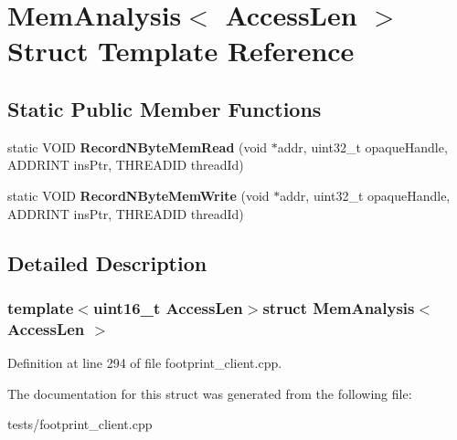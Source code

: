 \hypertarget{structMemAnalysis}{\section{Mem\-Analysis$<$ Access\-Len $>$ Struct Template Reference}
\label{structMemAnalysis}
}
\subsection*{Static Public Member Functions}
\begin{DoxyCompactItemize}
\item 
\hypertarget{structMemAnalysis_aff4263a12eb72138ab3203ef23998f28}{static V\-O\-I\-D {\bfseries Record\-N\-Byte\-Mem\-Read} (void $\ast$addr, uint32\-\_\-t opaque\-Handle, A\-D\-D\-R\-I\-N\-T ins\-Ptr, T\-H\-R\-E\-A\-D\-I\-D thread\-Id)}\label{structMemAnalysis_aff4263a12eb72138ab3203ef23998f28}

\item 
\hypertarget{structMemAnalysis_a265187f7d059c0b3592ef86932f7caf7}{static V\-O\-I\-D {\bfseries Record\-N\-Byte\-Mem\-Write} (void $\ast$addr, uint32\-\_\-t opaque\-Handle, A\-D\-D\-R\-I\-N\-T ins\-Ptr, T\-H\-R\-E\-A\-D\-I\-D thread\-Id)}\label{structMemAnalysis_a265187f7d059c0b3592ef86932f7caf7}

\end{DoxyCompactItemize}


\subsection{Detailed Description}
\subsubsection*{template$<$uint16\-\_\-t Access\-Len$>$struct Mem\-Analysis$<$ Access\-Len $>$}



Definition at line 294 of file footprint\-\_\-client.\-cpp.



The documentation for this struct was generated from the following file\-:\begin{DoxyCompactItemize}
\item 
tests/footprint\-\_\-client.\-cpp\end{DoxyCompactItemize}
